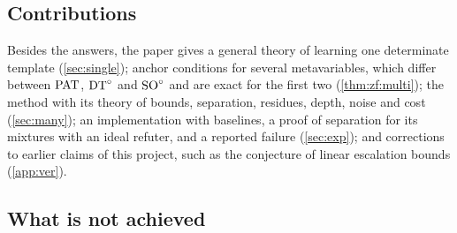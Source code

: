 \subsection{Contributions}\label{sec:intro:contrib}

Besides the answers, the paper gives a general theory of learning one determinate template (\cref{sec:single}); anchor
conditions for several metavariables, which differ between $\mathrm{PAT}$, $\mathrm{DT}^{\circ}$ and $\mathrm{SO}^{\circ}$ and are exact for the first two
(\cref{thm:zf:multi}); the method \DTRC{} with its theory of bounds, separation, residues, depth, noise and cost
(\cref{sec:many}); an implementation with baselines, a proof of separation for its mixtures with an ideal refuter, and a
reported failure (\cref{sec:exp}); and corrections to earlier claims of this project, such as the conjecture of linear
escalation bounds (\cref{app:ver}).

\subsection{What is not achieved}\label{sec:intro:limits}

